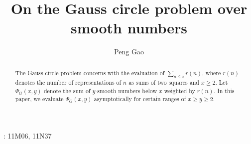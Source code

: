 \documentclass[twoside,leqno,10pt, A4]{amsart}
\begin{document}
\newcommand{\pfrac}[2]{\left(\frac{#1}{#2}\right)}
\newcommand{\pmfrac}[2]{\left(\mfrac{#1}{#2}\right)}
\newcommand{\ptfrac}[2]{\left(\tfrac{#1}{#2}\right)}
\newcommand{\pMatrix}[4]{\left(\begin{matrix}#1 & #2 \\ #3 & #4\end{matrix}\right)}
\newcommand{\ppMatrix}[4]{\left(\!\pMatrix{#1}{#2}{#3}{#4}\!\right)}
\renewcommand{\pmatrix}[4]{\left(\begin{smallmatrix}#1 & #2 \\ #3 & #4\end{smallmatrix}\right)}
\def\en{{\mathbf{\,e}}_n}

\newcommand{\ppmod}[1]{\hspace{-0.15cm}\pmod{#1}}
\newcommand{\ccom}[1]{{\color{red}{Chantal: #1}} }
\newcommand{\acom}[1]{{\color{blue}{Alia: #1}} }
\newcommand{\alexcom}[1]{{\color{green}{Alex: #1}} }
\newcommand{\hcom}[1]{{\color{brown}{Hua: #1}} }


\makeatletter
\def\widebreve{\mathpalette\wide@breve}
\def\wide@breve#1#2{\sbox\z@{$#1#2$}%
     \mathop{\vbox{\m@th\ialign{##\crcr
\kern0.08em\brevefill#1{0.8\wd\z@}\crcr\noalign{\nointerlineskip}%
                    $\hss#1#2\hss$\crcr}}}\limits}
\def\brevefill#1#2{$\m@th\sbox\tw@{$#1($}%
  \hss\resizebox{#2}{\wd\tw@}{\rotatebox[origin=c]{90}{\upshape(}}\hss$}
\makeatletter

\title[On the Gauss circle problem over smooth numbers]{On the Gauss circle problem over smooth numbers}

\author[P. Gao]{Peng Gao}
\address{School of Mathematical Sciences, Beihang University, Beijing 100191, China}



\begin{abstract}
   The Gauss circle problem concerns with the evaluation of $\sum_{n \leq x}r(n)$, where $r(n)$ denotes the number of representations of $n$ as sums of two squares and $x \geq 2$. Let $\Psi_G(x,y)$ denote the sum of $y$-smooth numbers below $x$ weighted by $r(n)$. In this paper, we evaluate $\Psi_G(x,y)$  asymptotically for certain ranges of $x \geq y \geq 2$.
\end{abstract}

\maketitle

: 11M06, 11N37   \newline
\end{document}
